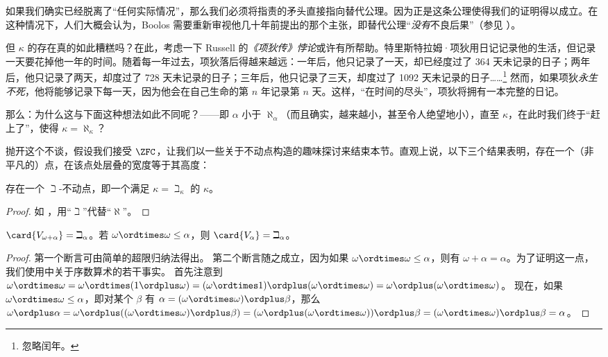 \documentclass[../../../include/open-logic-section]{subfiles}
\begin{document}
如果我们确实已经脱离了“任何实际情况”，那么我们必须将指责的矛头直接指向替代公理。因为正是这条公理使得我们的证明得以成立。在这种情况下，人们大概会认为，Boolos 需要重新审视他几十年前提出的那个主张，即替代公理“\emph{没有}不良后果”（参见 ）。

但 $\kappa$ 的存在真的如此糟糕吗？在此，考虑一下 Russell 的\emph{《项狄传》悖论}或许有所帮助。特里斯特拉姆·项狄用日记记录他的生活，但记录一天要花掉他一年的时间。随着每一年过去，项狄落后得越来越远：一年后，他只记录了一天，却已经度过了 364 天未记录的日子；两年后，他只记录了两天，却度过了 728 天未记录的日子；三年后，他只记录了三天，却度过了 1092 天未记录的日子……\footnote{忽略闰年。} 然而，如果项狄\emph{永生不死}，他将能够记录下每一天，因为他会在自己生命的第 $n$ 年记录第 $n$ 天。这样，“在时间的尽头”，项狄将拥有一本完整的日记。

那么：为什么这与下面这种想法如此不同呢？——即 $\alpha$ 小于 $\aleph_\alpha$（而且确实，越来越小，甚至令人绝望地小），直至 $\kappa$，在此时我们终于“赶上了”，使得 $\kappa
= \aleph_\kappa$？

抛开这个不谈，假设我们接受 $\ZFC$，让我们以一些关于不动点构造的趣味探讨来结束本节。直观上说，以下三个结果表明，存在一个（非平凡的）点，在该点处层叠的宽度等于其高度：

\begin{prop}
存在一个 $\beth$-不动点，即一个满足 $\kappa=
\beth_\kappa$ 的 $\kappa$。
\end{prop}

\begin{proof}
如 ，用“$\beth$”代替“$\aleph$”。
\end{proof}

\begin{prop}
$\card{V_{\omega+\alpha}} = \beth_{\alpha}$。若 $\omega \ordtimes
\omega \leq \alpha$，则 $\card{V_\alpha} = \beth_\alpha$。
\end{prop}

\begin{proof}
第一个断言可由简单的超限归纳法得出。
第二个断言随之成立，因为如果 $\omega \ordtimes \omega \leq \alpha$，则有 $\omega + \alpha = \alpha$。为了证明这一点，我们使用中关于序数算术的若干事实。
首先注意到 $\omega \ordtimes \omega = \omega \ordtimes (1 \ordplus \omega) = (\omega  \ordtimes 1) \ordplus (\omega\ordtimes\omega) = \omega \ordplus (\omega \ordtimes \omega)$。
现在，如果 $\omega \ordtimes \omega \leq \alpha$，即对某个 $\beta$ 有 $\alpha = (\omega\ordtimes\omega) \ordplus \beta$，那么 $\omega \ordplus \alpha = \omega \ordplus ((\omega \ordtimes \omega) \ordplus \beta) = (\omega \ordplus (\omega \ordtimes \omega)) \ordplus \beta = (\omega \ordtimes \omega) \ordplus \beta = \alpha$。
\end{proof}
\end{document}
